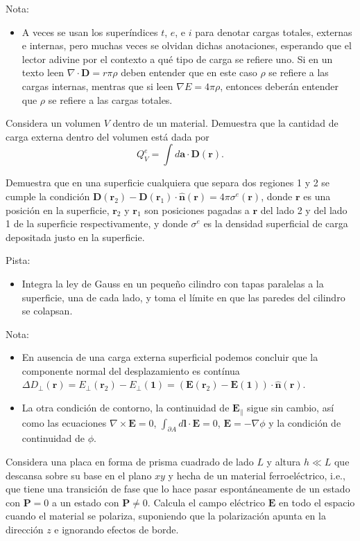 \documentclass{exam}
\begin{document}
\begin{questions}
  Nota:
  \begin{itemize}
  \item A veces se usan los superíndices $t$, $e$, e $i$ para denotar
    cargas totales, externas e internas, pero muchas veces se olvidan
    dichas anotaciones, esperando que el lector adivine por el
    contexto a qué tipo de carga se refiere uno. Si en un texto leen
    $\nabla\cdot \bm D=r\pi\rho$ deben entender que en este caso $\rho$
    se refiere a las cargas internas, mentras que si leen $\nabla
    E=4\pi\rho$, entonces deberán entender que $\rho$ se refiere a las
    cargas totales.
  \end{itemize}

  \question Considera un volumen $V$ dentro de un material. Demuestra
  que la cantidad de carga externa dentro del volumen está dada por
  $$
  Q^e_V=\int d\bm a\cdot\bm D(\bm r).
  $$

  \question Demuestra que en una superficie cualquiera que separa dos
  regiones 1 y 2 se cumple la condición
  $\bm D(\bm r_2)-\bm D(\bm r_1)\cdot\hat{\bm n}(\bm
  r)=4\pi\sigma^e(\bm r)$, donde $\bm r$ es una posición en la superficie, $\bm
  r_2$ y $\bm r_1$ son posiciones pagadas a $\bm r$ del lado 2 y del
  lado 1 de la superficie respectivamente, y donde $\sigma^e$ es la
  densidad superficial de carga depositada justo en la superficie.

  Pista:
  \begin{itemize}
  \item Integra la ley de Gauss en un pequeño cilindro con tapas
    paralelas a la superficie, una de cada lado, y toma el límite en
    que las paredes del cilindro se colapsan.
  \end{itemize}

  Nota:
  \begin{itemize}
  \item En ausencia de una carga externa superficial podemos concluir
    que la componente normal del desplazamiento es contínua $\Delta
    D_\perp(\bm r)=E_\perp(\bm r_2)-E_\perp(\bm 1)=(\bm E(\bm r_2)-\bm
    E(\bm 1))\cdot\hat{\bm n}(\bm r)$.
  \item La otra condición de contorno, la continuidad de $\bm E_\|$
    sigue sin cambio, así como las ecuaciones $\nabla\times\bm E=0$,
    $\int_{\partial A}d \bm l\cdot\bm E=0$, $\bm E=-\nabla\phi$ y la
    condición de continuidad de $\phi$.
  \end{itemize}

  \question Considera una placa en forma de prisma cuadrado de lado
  $L$ y altura $h\ll L$ que descansa sobre su base en el plano $xy$ y
  hecha de un material ferroeléctrico, i.e., que
  tiene una transición de fase que lo hace pasar espontáneamente de un
  estado con $\bm P=0$ a un estado con $\bm P\ne 0$. Calcula el campo
  eléctrico $\bm E$ en todo el espacio cuando el material se polariza,
  suponiendo que la polarización apunta en la dirección $z$ e
  ignorando efectos de borde.


\end{questions}
\end{document}
